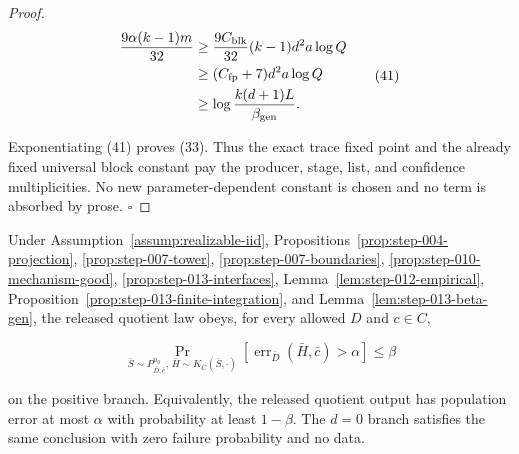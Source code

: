 \begin{proof}
\[
\begin{aligned}
 \frac{9\alpha(k-1)m}{32}
 &\geq\frac{9C_{\rm blk}}{32}(k-1)d^2a\log Q\\
 &\geq(C_{\rm fp}+7)d^2a\log Q\\
 &\geq\log\frac{k(d+1)L}{\beta_{\rm gen}}.
\end{aligned}
 \tag{41}
\]

Exponentiating (41) proves (33). Thus the exact  trace fixed point
and the already fixed universal block constant pay the producer, stage,
list, and confidence multiplicities. No new parameter-dependent constant is
chosen and no term is absorbed by prose. \(\square\)


\end{proof}

\begin{proposition}\label{prop:step-013-pac}
Under Assumption~\ref{assump:realizable-iid}, 
Propositions~\ref{prop:step-004-projection},
\ref{prop:step-007-tower},
\ref{prop:step-007-boundaries},
\ref{prop:step-010-mechanism-good},
\ref{prop:step-013-interfaces}, Lemma~\ref{lem:step-012-empirical},
Proposition~\ref{prop:step-013-finite-integration}, and
Lemma~\ref{lem:step-013-beta-gen}, the released quotient law obeys, for
every allowed \(D\) and \(c\in C\),

\[
 \Pr_{\bar S\sim P_{\bar D,\bar c}^{n_0},\,
          \bar H\sim K_C(\bar S,\cdot)}
 \left[\operatorname{err}_{\bar D}(\bar H,\bar c)>\alpha\right]
 \leq\beta
 \tag{42}
\]

on the positive branch. Equivalently, the released quotient output has
population error at most \(\alpha\) with probability at least \(1-\beta\).
The  \(d=0\) branch satisfies the same conclusion with zero failure
probability and no data.


\end{proposition}

